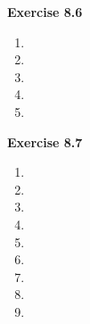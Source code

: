 




\textbf{Exercise 8.6}
\begin{enumerate}
    \item 
    \item 
    \item 
    \item 
    \item 
\end{enumerate}

\textbf{Exercise 8.7}
\begin{enumerate}
    \item 
    \item 
    \item 
    \item 
    \item 
    \item 
    \item 
    \item 
    \item 
\end{enumerate}


